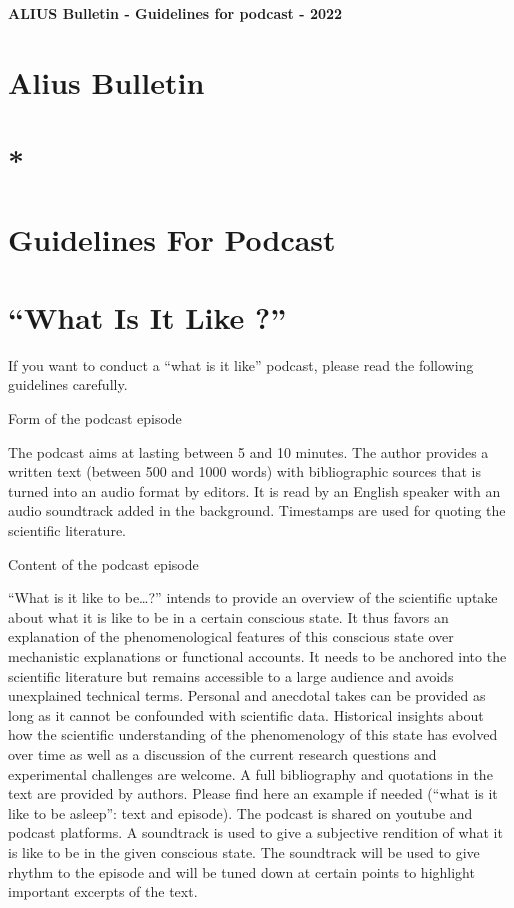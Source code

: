 \documentclass[11pt]{article}
\begin{document}
{\LARGE\bfseries ALIUS Bulletin - Guidelines for podcast - 2022\par}
\vspace{1em}
\section*{Alius Bulletin}
\section*{*}
\section*{Guidelines For Podcast}
\section*{“What Is It Like ?”}
If you want to conduct a “what is it like” podcast, please read the following guidelines carefully.\par

Form of the podcast episode\par

The podcast aims at lasting between 5 and 10 minutes. The author provides a written text (between 500 and 1000 words) with bibliographic sources that is turned into an audio format by editors. It is read by an English speaker with an audio soundtrack added in the background. Timestamps are used for quoting the scientific literature.\par

Content of the podcast episode\par

“What is it like to be…?” intends to provide an overview of the scientific uptake about what it is like to be in a certain conscious state. It thus favors an explanation of the phenomenological features of this conscious state over mechanistic explanations or functional accounts. It needs to be anchored into the scientific literature but remains accessible to a large audience and avoids unexplained technical terms. Personal and anecdotal takes can be provided as long as it cannot be confounded with scientific data. Historical insights about how the scientific understanding of the phenomenology of this state has evolved over time as well as a discussion of the current research questions and experimental challenges are welcome. 
A full bibliography and quotations in the text are provided by authors. Please find here an example if needed (“what is it like to be asleep”: text and episode).
The podcast is shared on youtube and podcast platforms. A soundtrack is used to give a subjective rendition of what it is like to be in the given conscious state. The soundtrack will be used to give rhythm to the episode and will be tuned down at certain points to highlight important excerpts of the text.\par
\end{document}
